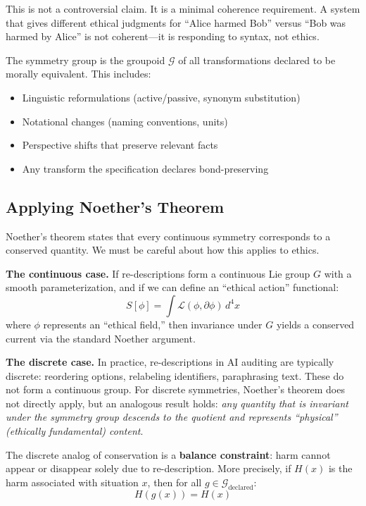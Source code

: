 \documentclass[12pt,letterpaper]{article}
\theoremstyle{definition}
\theoremstyle{remark}
\newcommand{\G}{\mathcal{G}}
\begin{document}
This is not a controversial claim. It is a minimal coherence requirement. A system that gives different ethical judgments for ``Alice harmed Bob'' versus ``Bob was harmed by Alice'' is not coherent---it is responding to syntax, not ethics.

The symmetry group is the groupoid $\G$ of all transformations declared to be morally equivalent. This includes:
\begin{itemize}
    \item Linguistic reformulations (active/passive, synonym substitution)
    \item Notational changes (naming conventions, units)
    \item Perspective shifts that preserve relevant facts
    \item Any transform the specification declares bond-preserving
\end{itemize}

\subsection{Applying Noether's Theorem}

Noether's theorem states that every continuous symmetry corresponds to a conserved quantity. We must be careful about how this applies to ethics.

\textbf{The continuous case.} If re-descriptions form a continuous Lie group $G$ with a smooth parameterization, and if we can define an ``ethical action'' functional:
\begin{equation}
S[\phi] = \int \mathcal{L}(\phi, \partial \phi) \, d^4x
\end{equation}
where $\phi$ represents an ``ethical field,'' then invariance under $G$ yields a conserved current via the standard Noether argument.

\textbf{The discrete case.} In practice, re-descriptions in AI auditing are typically discrete: reordering options, relabeling identifiers, paraphrasing text. These do not form a continuous group. For discrete symmetries, Noether's theorem does not directly apply, but an analogous result holds: \textit{any quantity that is invariant under the symmetry group descends to the quotient and represents ``physical'' (ethically fundamental) content}.

The discrete analog of conservation is a \textbf{balance constraint}: harm cannot appear or disappear solely due to re-description. More precisely, if $H(x)$ is the harm associated with situation $x$, then for all $g \in \G_{\text{declared}}$:
\begin{equation}
H(g(x)) = H(x)
\end{equation}
\end{document}

